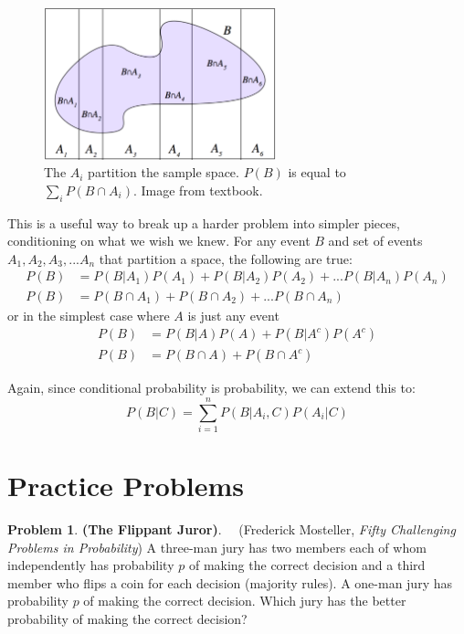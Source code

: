 \documentclass[10pt]{article}
\theoremstyle{definition}
\newtheorem{prob}[theo]{\color{Maroon} Problem}
\theoremstyle{remark}
\begin{document}
\begin{figure}[H]\centering
	\includegraphics[width = 0.6\textwidth]{image/lotp.png}
	\caption{The $A_i$ partition the sample space. $P(B)$ is equal to $\sum_i P (B \cap A_i)$. Image from textbook.}
\end{figure}

This is a useful way to break up a harder problem into simpler pieces, conditioning on what we wish we knew. For any event $B$ and set of events $A_1, A_2, A_3, ... A_n$ that partition a space, the following are true:
   \begin{align*} 
        P(B) &= P(B | A_1)P(A_1) + P(B | A_2)P(A_2) + ...  P(B | A_n)P(A_n)\\
        P(B) &= P(B \cap A_1)+ P(B \cap A_2)+ ...  P(B \cap A_n)
   \end{align*} 
   or in the simplest case where $A$ is just any event
   \begin{align*} 
        P(B) &= P(B | A)P(A) + P(B | A^c)P(A^c) \\
        P(B) &= P(B \cap A)+ P(B \cap A^c)
   \end{align*} 

Again, since conditional probability is probability, we can extend this to: $$ P(B|C) = \sum_{i=1}^n P(B|A_i, C) P(A_i | C) $$

\pagebreak
\section{Practice Problems}

\begin{prob} \textbf{(The Flippant Juror)}. \ \ (Frederick Mosteller, \emph{Fifty Challenging Problems in Probability}) A three-man jury has two members each of whom independently has probability $p$ of making the correct decision and a third member who flips a coin for each decision (majority rules). A one-man jury has probability $p$ of making the correct decision. Which jury has the better probability of making the correct decision?

\end{prob}
\end{document}
